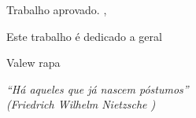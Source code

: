 \documentclass[12pt]{abntex2}
\begin{document}
\imprimircapa
\imprimirfolhaderosto

\begin{folhadeaprovacao} 
\begin{center}  
{\ABNTEXchapterfont\large\textsc{\imprimirautor}}

{\ABNTEXchapterfont\Large\bfseries{\imprimirtitulo}} 
\end{center} 
\vspace{1cm}
\hspace{.45\textwidth} 
\begin{minipage}
{.5\textwidth}\imprimirpreambulo
\end{minipage}

\vspace{1cm}
Trabalho aprovado. \imprimirlocal, \imprimirdata


\begin{center}
\vfill
{\large\imprimirlocal}
\par
{\large\imprimirdata}
\end{center}
\end{folhadeaprovacao}


\begin{dedicatoria}
\vspace*{\fill}
Este trabalho é dedicado a geral
\vspace*{\fill}
\end{dedicatoria}
\begin{agradecimentos}
Valew rapa
\end{agradecimentos}


\begin{epigrafe}
\vspace*{\fill}
\begin{flushright}
\textit{``Há aqueles que já nascem póstumos''\\ (Friedrich Wilhelm Nietzsche )}
\end{flushright}
\end{epigrafe}
\end{document}
